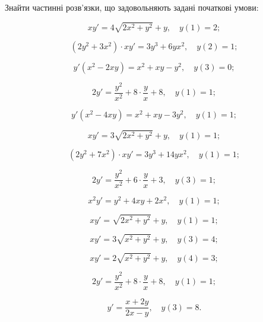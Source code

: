 Знайти частинні розв'язки, що задовольняють задані початкові умови:
\begin{problem}
	\[ x y' = 4 \sqrt{2x^2 + y^2} + y, \quad y(1) = 2; \]
\end{problem}

\begin{problem}
	\[ (2y^2 + 3x^2) \cdot xy' = 3y^3 + 6yx^2, \quad y(2) = 1; \]
\end{problem}

\begin{problem}
	\[ y' (x^2 - 2xy) = x^2 + xy - y^2, \quad y(3) = 0; \]
\end{problem}

\begin{problem}
	\[ 2 y' = \frac{y^2}{x^2} + 8 \cdot \frac{y}{x} + 8, \quad y(1) = 1; \]
\end{problem}

\begin{problem}
	\[ y' (x^2 - 4xy) = x^2 + xy - 3 y^2, \quad y(1) = 1; \]
\end{problem}

\begin{problem}
	\[ xy' = 3 \sqrt{2x^2 + y^2} + y, \quad y(1) = 1; \]
\end{problem}

\begin{problem}
	\[ (2y^2 + 7x^2)\cdot x y' = 3y^3 + 14yx^2, \quad y(1) = 1; \]
\end{problem}

\begin{problem}
	\[ 2y' = \frac{y^2}{x^2} + 6 \cdot \frac{y}{x} + 3, \quad y(3) = 1; \]
\end{problem}

\begin{problem}
	\[ x^2 y' = y^2 + 4xy + 2x^2, \quad y(1) = 1; \]
\end{problem}

\begin{problem}
	\[ xy' = \sqrt{2x^2 + y^2} + y, \quad y(1) = 1; \]
\end{problem}

\begin{problem}
	\[ xy' = 3 \sqrt{x^2 + y^2} + y, \quad y(3) = 4; \]
\end{problem}

\begin{problem}
	\[ xy' = 2 \sqrt{x^2 + y^2} + y, \quad y(4) = 3; \]
\end{problem}

\begin{problem}
	\[ 2y' = \frac{y^2}{x^2} + 8 \cdot \frac{y}{x} + 8, \quad y(1) = 1; \]
\end{problem}

\begin{problem}
	\[ y' = \frac{x + 2y}{2x - y}, \quad y(3) = 8. \]
\end{problem}